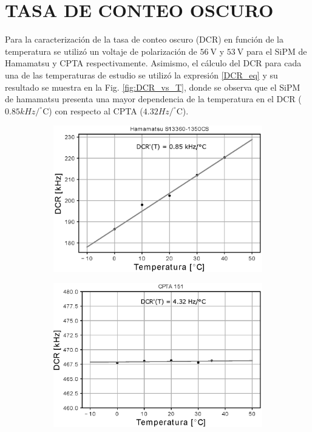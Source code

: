 \section{TASA DE CONTEO OSCURO}
Para la caracterización de la tasa de conteo oscuro (DCR) en función de la temperatura se utilizó un voltaje de polarización de $56~\mbox{V}$ y $53 ~\mbox{V}$ para el SiPM de Hamamatsu y CPTA respectivamente. Asimismo, el cálculo del DCR para cada una de las temperaturas de estudio se utilizó la expresión \ref{DCR_eq} y su resultado se muestra en la Fig. \ref{fig:DCR_vs_T}, donde se observa que el SiPM de hamamatsu presenta una mayor dependencia de la temperatura en el DCR ($0.85 kHz/ ^\circ$C) con respecto al CPTA ($4.32 Hz/ ^\circ$C). 
\begin{figure}[h!]
     \centering
     \begin{subfigure}[b]{0.49\textwidth}
         \centering
         \includegraphics[width=1.1\textwidth]{Images/DCR_T_1350CS.eps}
         \caption{}
         \label{fig:DCR_T_1350CS}
     \end{subfigure}
     \begin{subfigure}[b]{0.49\textwidth}
         \centering
         \includegraphics[width=1.1\textwidth]{Images/DCR_T_CPTA.eps}

\end{subfigure}
\end{figure}
